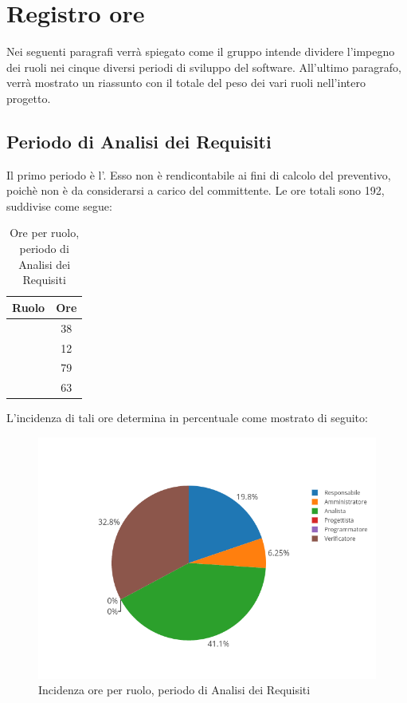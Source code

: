 \newpage
\section{Registro ore}
Nei seguenti paragrafi verrà spiegato come il gruppo intende dividere l'impegno dei ruoli nei cinque diversi periodi di sviluppo del software. All'ultimo paragrafo, verrà mostrato un riassunto con il totale del peso dei vari ruoli nell'intero progetto.

\subsection{Periodo di Analisi dei Requisiti}
Il primo periodo è l'\AdR. Esso non è rendicontabile ai fini di calcolo del preventivo, poichè non è da considerarsi a carico del committente. Le ore totali sono 192, suddivise come segue:

\begin{table}[H]
	\begin{center}
		\begin{tabular}{|c|c|}
			\hline
			\textbf{Ruolo}	& \textbf{Ore} \\
			\hline
			\Res	&	38	\\
			\hline
			\Amm	&	12	\\
			\hline
			\Ana	&	79	\\
			\hline
			\Ver	&	63	\\
			\hline
		\end{tabular}
	\end{center}
	\caption{Ore per ruolo, periodo di Analisi dei Requisiti}
\end{table}

L'incidenza di tali ore determina in percentuale come mostrato di seguito:
\begin{figure}[H]
	\centering
	\includegraphics[scale=0.6]{img/AnalisiRequisiiti.png}
	\caption{Incidenza ore per ruolo, periodo di Analisi dei Requisiti}
\end{figure}

